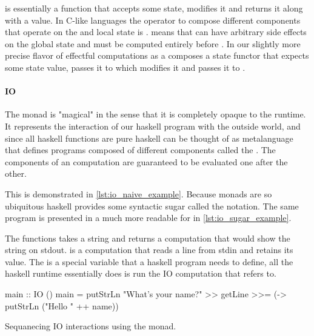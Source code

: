    is essentially a function that accepts some state, modifies it
  and returns it along with a value. In C-like languages the operator to
  compose different components that operate on the and local state is
  \cpp{;}.  means that  can have arbitrary side effects on
  the global state and must be computed entirely before . In our
  slightly more precise flavor of effectful computations  as a
   composes a state functor that expects some state value, passes
  it to  which modifies it and passes it to .

  \paragraph{IO}

  The  monad is "magical" in the sense that it is completely
  opaque to the runtime. It represents the interaction of our haskell
  program with the outside world, and since all haskell functions are
  pure haskell can be thought of as metalanguage that defines programs
  composed of different  components called the . The components of an  computation are guaranteed to
  be evaluated one after the other.

  This is demonstrated in \ref{lst:io_naive_example}. Because monads are so
  ubiquitous haskell provides some syntactic sugar called the 
  notation. The same program is presented in a much more readable for in
  \ref{lst:io_sugar_example}.

  The functions  takes a string and returns
  a computation that would show the string on stdout.  is a computation that reads a line from stdin and retains its
  value. The  is a special variable that a haskell
  program needs to define, all the haskell runtime essentially does is
  run the IO computation that  refers to.

  \begin{code}
\begin{haskellcode}
main :: IO ()
main = putStrLn "What's your name?"
       >> getLine
       >>= (\name -> putStrLn ("Hello " ++ name))
\end{haskellcode}
    \caption{\label{lst:io_naive_example}Sequanecing IO interactions
      using the  monad.}
  \end{code}


